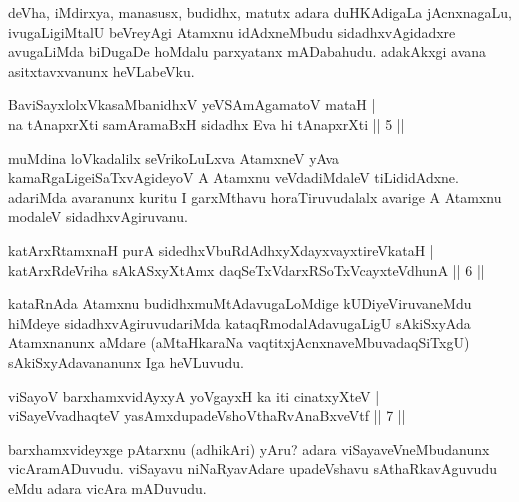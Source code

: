 \begin{artha}
deVha, iMdirxya, manasusx, budidhx, matutx adara duHKAdigaLa jAcnxnagaLu, ivugaLigiMtalU beVreyAgi Atamxnu idAdxneMbudu sidadhxvAgidadxre avugaLiMda biDugaDe hoMdalu parxyatanx mADabahudu. adakAkxgi avana asitxtavxvanunx heVLabeVku.
\end{artha}


\begin{shl}
BaviSayxlolxVkasaMbanidhxV yeVSAmAgamatoV mataH |\\
na tAnapxrXti samAramaBxH sidadhx Eva hi tAnapxrXti \hfill || 5 ||
\end{shl}

\begin{artha}
muMdina loVkadalilx seVrikoLuLxva AtamxneV yAva kamaRgaLige\break iSaTxvAgideyoV A Atamxnu veVdadiMdaleV tiLididAdxne. adariMda avaranunx kuritu I garxMthavu horaTiruvudalalx avarige A Atamxnu modaleV sidadhxvAgiruvanu.
\end{artha}

\begin{shl}
katArxRtamxnaH purA sidedhxVbuRdAdhxyXdayxvayxtireVkataH |\\
katArxRdeVriha sAkASxyXtAmx daqSeTxVdarxRSoTxVcayxteV\s dhunA \hfill || 6 ||
\end{shl}

\begin{artha}
kataRnAda Atamxnu budidhxmuMtAdavugaLoMdige kUDiyeV\break iruvaneMdu hiMdeye sidadhxvAgiruvudariMda kataqRmodalAdavugaLigU sAkiSxyAda Atamxnanunx aMdare (aMtaHkaraNa vaqtitxjAcnxnaveMbuva\ndash daqSiTxgU) sAkiSxyAdavananunx Iga heVLuvudu.
\end{artha}

\begin{shl}
viSayoV barxhamxvidAyxyA yoVgayxH ka iti cinatxyXteV |\\
viSayeV\s vadhaqteV yasAmxdupadeVshoV\s thaRvAnaBxveVtf \hfill || 7 ||
\end{shl}

\begin{artha}
barxhamxvideyxge pAtarxnu (adhikAri) yAru? adara viSayaveVneMbudanunx vicAramADuvudu. viSayavu niNaRyavAdare upadeVshavu sAthaRkavAguvudu eMdu adara vicAra mADuvudu.
\end{artha}


